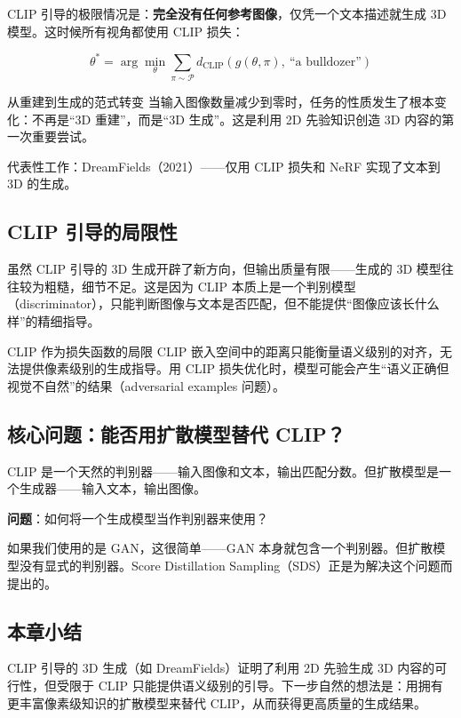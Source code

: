 \documentclass[a4paper]{article}
\begin{document}
CLIP 引导的极限情况是：\textbf{完全没有任何参考图像}，仅凭一个文本描述就生成 3D 模型。这时候所有视角都使用 CLIP 损失：

$$
\theta^* = \arg\min_{\theta} \sum_{\pi \sim \mathcal{P}} d_{\text{CLIP}}(g(\theta, \pi),\ \text{``a bulldozer''})
$$

\begin{importantbox}{从重建到生成的范式转变}
当输入图像数量减少到零时，任务的性质发生了根本变化：不再是``3D 重建''，而是``3D 生成''。这是利用 2D 先验知识创造 3D 内容的第一次重要尝试。

代表性工作：DreamFields（2021）——仅用 CLIP 损失和 NeRF 实现了文本到 3D 的生成。
\end{importantbox}

\subsection{CLIP 引导的局限性}

虽然 CLIP 引导的 3D 生成开辟了新方向，但输出质量有限——生成的 3D 模型往往较为粗糙，细节不足。这是因为 CLIP 本质上是一个判别模型（discriminator），只能判断图像与文本是否匹配，但不能提供``图像应该长什么样''的精细指导。

\begin{warningbox}{CLIP 作为损失函数的局限}
CLIP 嵌入空间中的距离只能衡量语义级别的对齐，无法提供像素级别的生成指导。用 CLIP 损失优化时，模型可能会产生``语义正确但视觉不自然''的结果（adversarial examples 问题）。
\end{warningbox}

\subsection{核心问题：能否用扩散模型替代 CLIP？}

CLIP 是一个天然的判别器——输入图像和文本，输出匹配分数。但扩散模型是一个生成器——输入文本，输出图像。

\textbf{问题}：如何将一个生成模型当作判别器来使用？

如果我们使用的是 GAN，这很简单——GAN 本身就包含一个判别器。但扩散模型没有显式的判别器。Score Distillation Sampling（SDS）正是为解决这个问题而提出的。

\subsection{本章小结}

CLIP 引导的 3D 生成（如 DreamFields）证明了利用 2D 先验生成 3D 内容的可行性，但受限于 CLIP 只能提供语义级别的引导。下一步自然的想法是：用拥有更丰富像素级知识的扩散模型来替代 CLIP，从而获得更高质量的生成结果。
\end{document}
